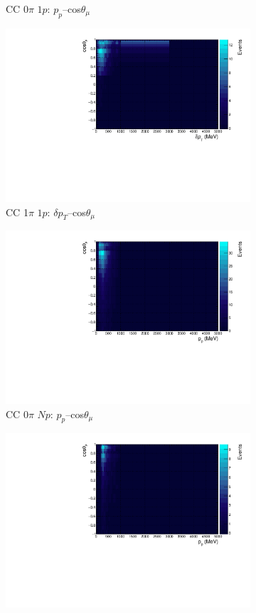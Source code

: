 \begin{figure}
\begin{subfigure}{.49\textwidth}
  \caption{CC 0$\pi$ $1p$: $p_{p}$--cos$\theta_{\mu}$}
\end{subfigure}
\begin{subfigure}{.49\textwidth}
  \centering
  \includegraphics[width=0.9\linewidth]{figs/hptpc_sigvar_cc1pi1p.pdf}
  \caption{CC 1$\pi$ $1p$: $\delta p_{T}$--cos$\theta_{\mu}$}
\end{subfigure}
\begin{subfigure}{.49\textwidth}
  \centering
  \includegraphics[width=0.9\linewidth]{figs/hptpc_sigvar_cc0piNp.pdf}
  \caption{CC 0$\pi$ $Np$: $p_{p}$--cos$\theta_{\mu}$}
\end{subfigure}
\begin{subfigure}{.49\textwidth}
  \centering
  \includegraphics[width=0.9\linewidth]{figs/hptpc_sigvar_cc1piNp.pdf}

\end{subfigure}
\end{figure}
